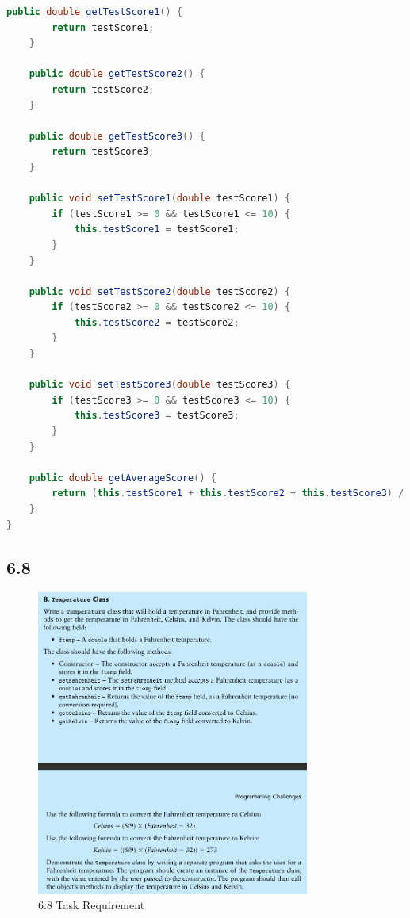 \documentclass{article}
\begin{document}
\begin{lstlisting}[language=Java, caption=Main and TestScore Classes]
    public double getTestScore1() {
        return testScore1;
    }

    public double getTestScore2() {
        return testScore2;
    }

    public double getTestScore3() {
        return testScore3;
    }

    public void setTestScore1(double testScore1) {
        if (testScore1 >= 0 && testScore1 <= 10) {
            this.testScore1 = testScore1;
        }
    }

    public void setTestScore2(double testScore2) {
        if (testScore2 >= 0 && testScore2 <= 10) {
            this.testScore2 = testScore2;
        }
    }

    public void setTestScore3(double testScore3) {
        if (testScore3 >= 0 && testScore3 <= 10) {
            this.testScore3 = testScore3;
        }
    }

    public double getAverageScore() {
        return (this.testScore1 + this.testScore2 + this.testScore3) / 3;
    }
}
\end{lstlisting}

\subsection*{6.8}

\begin{figure}[H]
    \centering
    \includegraphics[width=0.8\textwidth]{./Assets/Task requirements/Assignment7/6.8.png}
    \caption{6.8 Task Requirement}
\end{figure}
\end{document}
